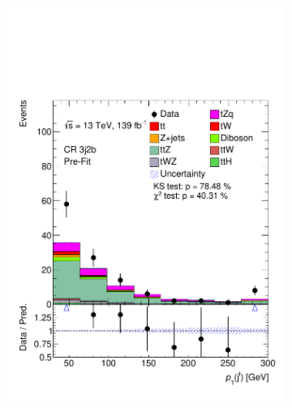 \begin{figure}[!h]
\begin{subfigure}[b]{0.33\linewidth}
    \includegraphics[width=\linewidth]{ubonn-thesis/Chapters/Chapters_06/Figure/Input_distribution/CR_3j2b_forwardjet_pt.pdf} 
  \end{subfigure}%
  \begin{subfigure}[b]{0.33\linewidth}
    \centering

\end{subfigure}
\end{figure}
